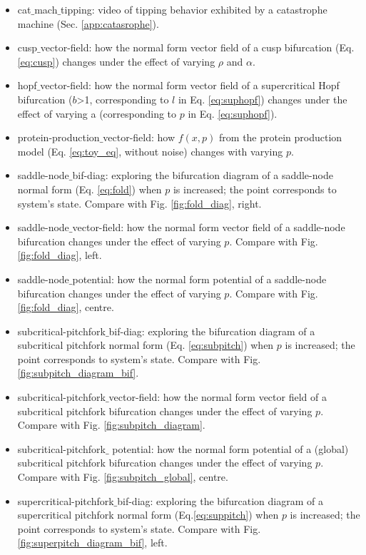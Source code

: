 \begin{itemize}
	\item cat$\_$mach$\_$tipping: video of tipping behavior exhibited by a catastrophe machine (Sec. \ref{app:catasrophe}).
	\item cusp$\_$vector-field: how the normal form vector field of a cusp bifurcation (Eq. \ref{eq:cusp}) changes under the effect of varying $\rho$ and $\alpha$. 
	\item hopf$\_$vector-field: how the normal form vector field of a supercritical Hopf bifurcation ($b$>1, corresponding to $l$ in Eq. \ref{eq:suphopf}) changes under the effect of varying a (corresponding to $p$  in Eq. \ref{eq:suphopf}).
	\item protein-production$\_$vector-field: how $f(x,p)$ from the protein production model (Eq. \ref{eq:toy_eq}, without noise) changes with varying $p$.
	\item saddle-node$\_$bif-diag: exploring the bifurcation diagram of a saddle-node normal form (Eq. \ref{eq:fold}) when $p$  is increased; the point corresponds to system’s state. Compare with Fig. \ref{fig:fold_diag}, right.
	\item saddle-node$\_$vector-field: how the normal form vector field of a saddle-node bifurcation changes under the effect of varying $p$. Compare with Fig. \ref{fig:fold_diag}, left.
	\item saddle-node$\_$potential: how the normal form potential of a saddle-node bifurcation changes under the effect of varying $p$. Compare with Fig. \ref{fig:fold_diag}, centre.
	\item subcritical-pitchfork$\_$bif-diag: exploring the bifurcation diagram of a subcritical pitchfork normal form (Eq. \ref{eq:subpitch}) when $p$  is increased; the point corresponds to system’s state. Compare with Fig. \ref{fig:subpitch_diagram_bif}.
	\item subcritical-pitchfork$\_$vector-field: how the normal form vector field of a subcritical pitchfork bifurcation changes under the effect of varying $p$. Compare with Fig. \ref{fig:subpitch_diagram}.
	\item subcritical-pitchfork$\_$ potential: how the normal form potential of a (global) subcritical pitchfork bifurcation changes under the effect of varying $p$. Compare with Fig. \ref{fig:subpitch_global}, centre.
	\item supercritical-pitchfork$\_$bif-diag: exploring the bifurcation diagram of a supercritical pitchfork normal form (Eq.\ref{eq:suppitch}) when $p$  is increased; the point corresponds to system’s state. Compare with Fig. \ref{fig:superpitch_diagram_bif}, left.

\end{itemize}
